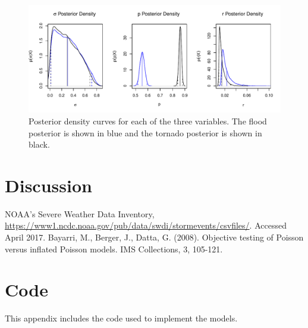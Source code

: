 \documentclass{article}\usepackage[]{graphicx}\usepackage[]{color}
\makeatletter
\def\maxwidth{ %
  \ifdim\Gin@nat@width>\linewidth
    \linewidth
  \else
    \Gin@nat@width
  \fi
}
\newenvironment{knitrout}{}{} %
\makeatother
\begin{document}
\begin{figure}
	\centering
\begin{knitrout}
\color{fgcolor}
\includegraphics[width=\maxwidth]{figure/zinbdensity-1} 

\end{knitrout}
	\caption{Posterior density curves for each of the three variables. The flood posterior is shown in blue and the tornado posterior is shown in black.}
	\label{f:zinbdensity}
\end{figure} 
\section{Discussion}
\label{s:discussion}

\begin{thebibliography}{2}
   NOAA's Severe Weather Data Inventory, 
    \url{https://www1.ncdc.noaa.gov/pub/data/swdi/stormevents/csvfiles/}. 
    Accessed April 2017.
   Bayarri, M., Berger, J., Datta, G. (2008). Objective testing of Poisson versus inflated Poisson models. IMS 	Collections, 3, 105-121. 
\end{thebibliography}
\clearpage
\appendix
\section{Code}
\label{a:code}
This appendix includes the code used to implement the models.
\end{document}
